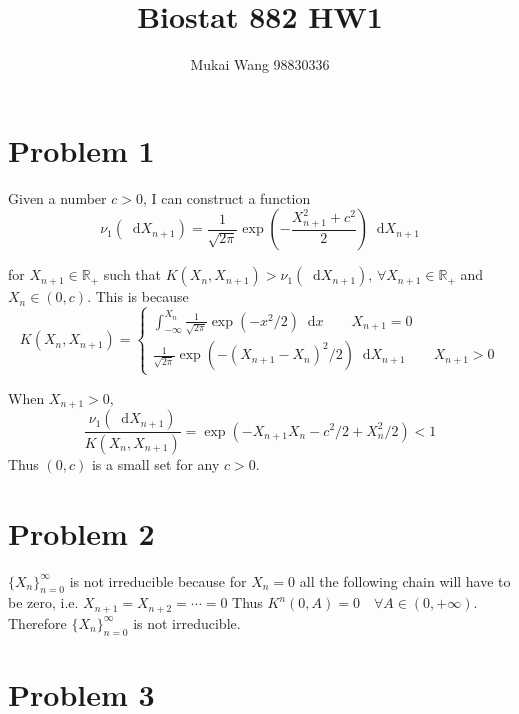 \documentclass[12pt]{article}
\title{Biostat 882 HW1}
\date{}
\author{Mukai Wang 98830336}
\newcommand*\diff{\mathop{}\!\mathrm{d}}
\begin{document}
\maketitle


\section*{Problem 1}

Given a number $c>0$, I can construct a function
\[\nu_1(\diff X_{n+1}) = \frac{1}{\sqrt{2\pi}} \exp (-\frac{X_{n+1}^2+c^2}{2})\diff X_{n+1} \]

for $X_{n+1} \in  \mathbb{R}_+$ such that $K(X_n, X_{n+1}) > \nu_1(\diff X_{n+1})$,
 $\forall X_{n+1} \in \mathbb{R}_{+}$ and $X_n \in (0, c)$. This is because
 $$K(X_n, X_{n+1}) = \begin{cases}
 	\int_{-\infty}^{X_n}\frac{1}{\sqrt{2\pi}} \exp(-x^2 /2)\diff x \qquad X_{n+1} = 0\\
 	\frac{1}{\sqrt{2\pi}} \exp(-(X_{n+1}-X_n)^2/2)\diff X_{n+1}\qquad X_{n+1} > 0
 \end{cases}
  $$
  
  When $X_{n+1} > 0$, 
  \[ \frac{\nu_1(\diff X_{n+1})}{K(X_n, X_{n+1})} = \exp(-X_{n+1}X_n - c^2/2 + X_{n}^2/2) < 1\]
  Thus $(0, c)$ is a small set for any $c>0$.
\section*{Problem 2}
 $\{X_n \}_{n=0}^{\infty}$ is not irreducible because for $X_n=0$ all the following chain will have to be zero, i.e. $X_{n+1} = X_{n+2} =\cdots =0$
 Thus $K^n (0, A) = 0 \quad \forall A\in (0, +\infty)$. Therefore $\{X_n \}_{n=0}^{\infty}$ is not irreducible.

\section*{Problem 3}
\end{document}
